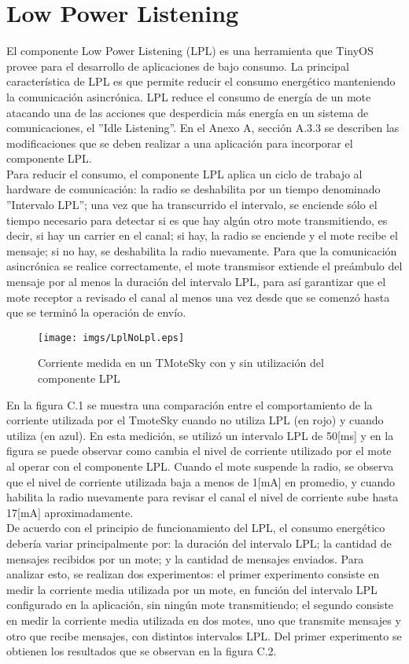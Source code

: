 \chapter{ Low Power Listening}
El componente Low Power Listening (LPL) es una herramienta que TinyOS provee para el desarrollo de aplicaciones de bajo consumo. La principal característica de LPL es que permite reducir el consumo energético manteniendo la comunicación asincrónica. LPL reduce el consumo de energía de un mote atacando una de las acciones que desperdicia más energía en un sistema de comunicaciones, el ''Idle Listening''. En el Anexo A, sección A.3.3 se describen las modificaciones que se deben realizar a una aplicación para incorporar el componente LPL.\\

Para reducir el consumo, el componente LPL aplica un ciclo de trabajo al hardware de comunicación: la radio se deshabilita por un tiempo denominado ''Intervalo LPL''; una vez que ha transcurrido el intervalo, se enciende sólo el tiempo necesario para detectar si es que hay algún otro mote transmitiendo, es decir, si hay un carrier en el canal; si hay, la radio se enciende y el mote recibe el mensaje; si no hay, se deshabilita la radio nuevamente. Para que la comunicación asincrónica se realice correctamente, el mote transmisor  extiende el preámbulo del mensaje por al menos la duración del intervalo LPL, para así garantizar que el mote receptor a revisado el canal al menos una vez desde que se comenzó hasta que se terminó la operación de envío.

\begin{figure}[H]
 \centering
 \texttt{[image: imgs/LplNoLpl.eps]}
 \caption{Corriente medida en un TMoteSky con y sin utilización del componente LPL}
\end{figure}

En la figura C.1 se muestra una comparación entre el comportamiento de la corriente utilizada por el TmoteSky cuando no utiliza LPL (en rojo) y cuando utiliza (en azul). En esta medición, se utilizó un intervalo LPL de 50[ms] y en la figura se puede observar como cambia el nivel de corriente utilizado por el mote al operar con el componente LPL. Cuando el mote suspende la radio, se observa que el nivel de corriente utilizada baja a menos de 1[mA] en promedio, y cuando habilita la radio nuevamente para revisar el canal el nivel de corriente sube hasta 17[mA] aproximadamente.\\

De acuerdo con el principio de funcionamiento del LPL, el consumo energético debería variar principalmente por: la duración del intervalo LPL; la cantidad de mensajes recibidos por un mote; y la cantidad de mensajes enviados. Para analizar esto, se realizan dos experimentos: el primer experimento consiste en medir la corriente media utilizada por un mote, en función del intervalo LPL configurado en la aplicación, sin ningún mote transmitiendo; el segundo consiste en medir la corriente media utilizada en dos motes, uno que transmite mensajes y otro que recibe mensajes, con distintos intervalos LPL. Del primer experimento se obtienen los resultados que se observan en la figura C.2.

